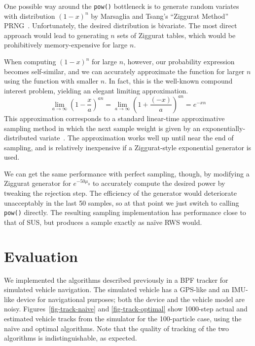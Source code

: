 \documentclass[12pt]{article}
\begin{document}
  One possible way around the {\tt pow()} bottleneck is to
  generate random variates with distribution $(1 - x)^n$ by
  Marsaglia and Tsang's ``Ziggurat Method''
  PRNG~\cite{ziggurat,ziggurat-fixes}.  Unfortunately, the
  desired distribution is bivariate.  The most direct
  approach would lead to generating $n$ sets of Ziggurat
  tables, which would be prohibitively memory-expensive for
  large $n$.

  When computing $(1 - x)^n$ for large $n$, however, our
  probability expression becomes self-similar, and we can
  accurately approximate the function for larger $n$ using
  the function with smaller $n$.  In fact, this is the
  well-known compound interest problem, yielding an elegant
  limiting approximation.
 $$
\lim_{a \rightarrow \infty}\left(1 - \frac{x}{a}\right)^{an}
  =   \lim_{a \rightarrow \infty}\left(1 + \frac{(-x)}{a}\right)^{an}
  = e^{-xn}$$
  This approximation corresponds to a standard linear-time
  approximative sampling method in which the next sample
  weight is given by an exponentially-distributed
  variate~\cite{carpenter}.  The approximation works well up
  until near the end of sampling, and is relatively
  inexpensive if a Ziggurat-style exponential generator is
  used.

  We can get the same performance with perfect sampling,
  though, by modifying a Ziggurat generator for
  $e^{-50\mu_0}$ to accurately compute the desired power by
  tweaking the rejection step.  The efficiency of the
  generator would deteriorate unacceptably in the last 50
  samples, so at that point we just switch to calling {\tt
  pow()} directly.  The resulting sampling implementation
  has performance close to that of SUS, but produces a
  sample exactly as na\"ive RWS would.

\section{Evaluation}

  We implemented the algorithms described previously in a
  BPF tracker for simulated vehicle navigation.  The
  simulated vehicle has a GPS-like and an IMU-like device
  for navigational purposes; both the device and the vehicle
  model are noisy.  Figures~\ref{fig-track-naive} and
  \ref{fig-track-optimal} show 1000-step actual and estimated vehicle
  tracks from the simulator for the 100-particle case, using
  the na\"ive and optimal algorithms.  Note
  that the quality of tracking of the two algorithms is
  indistinguishable, as expected.
\end{document}
